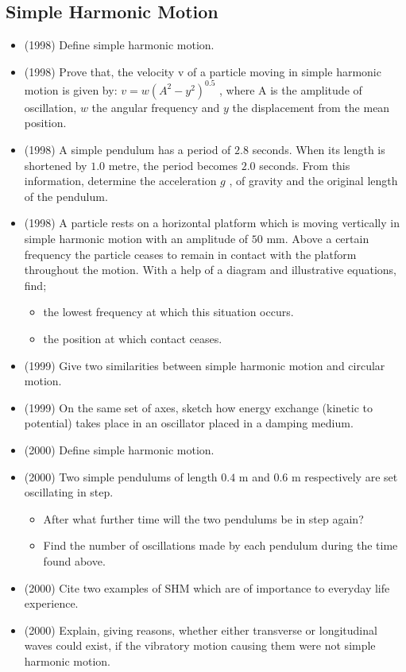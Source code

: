 \documentclass{article}
\begin{document}
\subsection{Simple Harmonic Motion}
\begin{itemize}
\item (1998)  Define simple harmonic motion.
\item (1998)  Prove that, the velocity v of a particle moving in simple harmonic motion is given by: $ v=w(A^{2}-y^{2})^{0.5}$ , where A is the amplitude of oscillation, $ w$ the angular frequency and $ y$ the displacement from the mean position.
\item (1998)  A simple pendulum has a period of $ 2.8$ seconds. When its length is shortened by $ 1.0$ metre, the period becomes $ 2.0$ seconds. From this information, determine the acceleration $ g$ , of gravity and the original length of the pendulum.
\item (1998)  A particle rests on a horizontal platform which is moving vertically in simple harmonic motion with an amplitude of $ 50$ mm. Above a certain frequency the particle ceases to remain in contact with the platform throughout the motion. With a help of a diagram and illustrative equations, find;\begin{itemize}
\item the lowest frequency at which this situation occurs.
\item the position at which contact ceases.
\end{itemize}
\item (1999)  Give two similarities between simple harmonic motion and circular motion.
\item (1999)  On the same set of axes, sketch how energy exchange (kinetic to potential) takes place in an oscillator placed in a damping medium.
\item (2000)  Define simple harmonic motion.
\item (2000)  Two simple pendulums of length $ 0.4$ m and $ 0.6$ m respectively are set oscillating in step. \begin{itemize}
\item After what further time will the two pendulums be in step again? 
\item Find the number of oscillations made by each pendulum during the time found above.
\end{itemize}
\item (2000)  Cite two examples of SHM which are of importance to everyday life experience.
\item (2000)  Explain, giving reasons, whether either transverse or longitudinal waves could exist, if the vibratory motion causing them were not simple harmonic motion.

\end{itemize}
\end{document}
